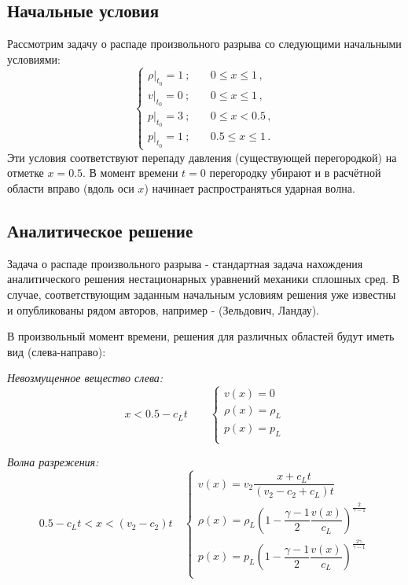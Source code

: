 \documentclass[a4paper]{article}
\begin{document}
	\subsection{Начальные условия}
	Рассмотрим задачу о распаде произвольного разрыва со следующими начальными условиями:
	\begin{equation}
	\begin{cases}
		\left.\rho \right|_{t_0} = 1 \:;		&\quad		0 \leqslant x \leqslant 1 \, ,	\\
		\left. v   \right|_{t_0} = 0 \:;		&\quad		0 \leqslant x \leqslant 1 \, ,	\\
		\left. p   \right|_{t_0} = 3 \:;		&\quad		0 \leqslant x < 0.5 \, ,	\\
		\left. p   \right|_{t_0} = 1 \:;		&\quad		0.5 \leqslant x \leqslant 1 \, .	
	\end{cases}
	\end{equation}	
	Эти условия соответствуют перепаду давления (существующей перегородкой) на отметке $x = 0.5$. В момент времени $t = 0$ перегородку убирают и в расчётной области вправо (вдоль оси $x$) начинает распространяться ударная волна.
	
	\subsection{Аналитическое решение}
	Задача о распаде произвольного разрыва - стандартная задача нахождения аналитического решения нестационарных уравнений механики сплошных сред. В случае, соответствующим заданным начальным условиям решения уже известны и опубликованы рядом авторов, например - (Зельдович, Ландау).
	
	В произвольный момент времени, решения для различных областей будут иметь вид (слева-направо):
	
	\textit{Невозмущенное вещество слева:}
	\begin{equation}
		x < 0.5 - c_L t		\qquad
		\begin{cases}
		v (x)		=	0		\\
		\rho (x)	=	\rho_L	\\
		p (x)		=	p_L		\\
		\end{cases}
	\end{equation}
	
	\textit{Волна разрежения:}
	\begin{equation}
	0.5 - c_L t	<	x	<	(v_2 - c_2)t		\quad
	\begin{cases}
	v (x)		=	v_2 \dfrac{x + c_L t}{(v_2 - c_2 + c_L)t}		\\
	\rho (x)	=	\rho_L \left(1 - \dfrac{\gamma - 1}{2} \dfrac{v(x)}{c_L}\right)^{\frac{2}{\gamma -1}}	\\
	p (x)		=	p_L \left(1 - \dfrac{\gamma - 1}{2} \dfrac{v(x)}{c_L}\right)^{\frac{2\gamma}{\gamma -1}}	\\
	\end{cases}
	\end{equation}
	
\end{document}
